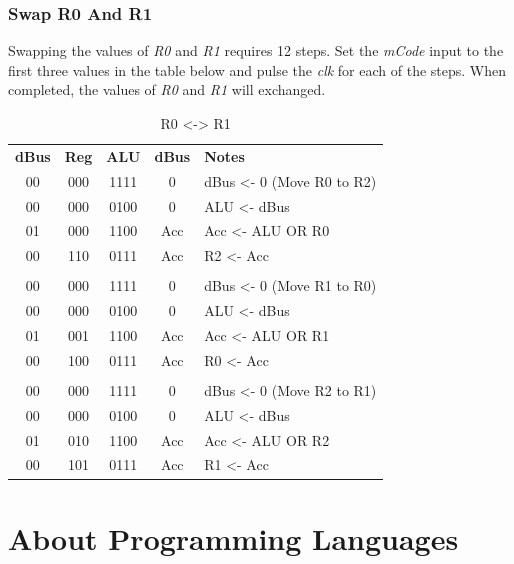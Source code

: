 \subsubsection{Swap R0 And R1}

Swapping the values of \textit{R0} and \textit{R1} requires 12 steps. Set the \textit{mCode} input to the first three values in the table below and pulse the \textit{clk} for each of the steps. When completed, the values of \textit{R0} and \textit{R1} will exchanged.

\begin{table}[H]
	\sffamily
	\newcommand{\head}[1]{\textcolor{white}{\textbf{#1}}}		
	\begin{center}
		\begin{tabular}{ccccl} 
			\textbf{dBus} & \textbf{Reg} & \textbf{ALU} & \textbf{dBus} & \textbf{Notes} \\
			00 & 000 & 1111 & 0 & dBus <- 0 (Move R0 to R2)\\
			00 & 000 & 0100 & 0 & ALU <- dBus \\
			01 & 000 & 1100 & Acc & Acc <- ALU OR R0 \\
			00 & 110 & 0111 & Acc & R2 <- Acc \\
 			& & & & \\ %

			00 & 000 & 1111 & 0 & dBus <- 0 (Move R1 to R0)\\
			00 & 000 & 0100 & 0 & ALU <- dBus \\
			01 & 001 & 1100 & Acc & Acc <- ALU OR R1 \\
			00 & 100 & 0111 & Acc & R0 <- Acc \\
 			& & & & \\ %

			00 & 000 & 1111 & 0 & dBus <- 0 (Move R2 to R1)\\
			00 & 000 & 0100 & 0 & ALU <- dBus \\
			01 & 010 & 1100 & Acc & Acc <- ALU OR R2 \\
			00 & 101 & 0111 & Acc & R1 <- Acc
		\end{tabular}
	\end{center}
	\caption{R0 <-> R1}
	\label{tab:11-08}
\end{table}

\section{About Programming Languages}

